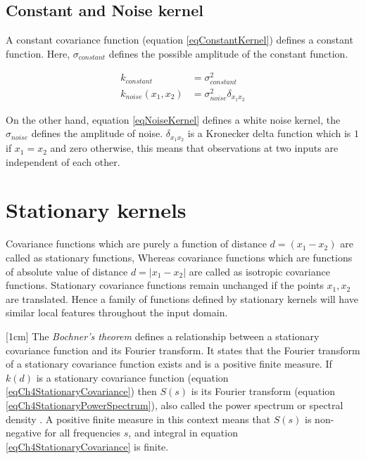 \subsection{Constant and Noise kernel}
A constant covariance function (equation \ref{eqConstantKernel}) defines a constant function. Here, $\sigma_{constant}$ defines the possible amplitude of the constant function.

\begin{align}
k_{constant} & = \sigma^2_{constant} \label{eqConstantKernel} \\
k_{noise}(x_{1}, x_{2}) & = \sigma^2_{noise}\delta_{x_{1}x_{2}} \label{eqNoiseKernel}
\end{align}

On the other hand, equation \ref{eqNoiseKernel} defines a white noise kernel, the $\sigma_{noise}$ defines the amplitude of noise. $\delta_{x_{1}x_{2}}$ is a Kronecker delta function which is $1$ if $x_{1} = x_{2}$ and zero otherwise, this means that observations at two inputs are independent of each other. 

\section{Stationary kernels} \label{secStationaryKernels}
Covariance functions which are purely a function of distance $d = (x_{1} - x_{2})$ are called as stationary functions, Whereas covariance functions which are functions of absolute value of distance $d = |x_{1} - x_{2}|$ are called as isotropic covariance functions. Stationary covariance functions remain unchanged if the points $x_{1}, x_{2}$ are translated. Hence a family of functions defined by stationary kernels will have similar local features throughout the input domain. 

[1cm]
The \textit{Bochner's theorem} defines a relationship between a stationary covariance function and its Fourier transform. It states that the Fourier transform of a stationary covariance function exists and is a positive finite measure. If $k(d)$ is a stationary covariance function (equation \ref{eqCh4StationaryCovariance}) then $S(s)$ is its Fourier transform (equation \ref{eqCh4StationaryPowerSpectrum}), also called the power spectrum or spectral density \cite{bochner1959lectures, Stein1999Springer, cox1977theory}. A positive finite measure in this context means that $S(s)$ is non-negative for all frequencies $s$, and integral in equation \ref{eqCh4StationaryCovariance} is finite.

